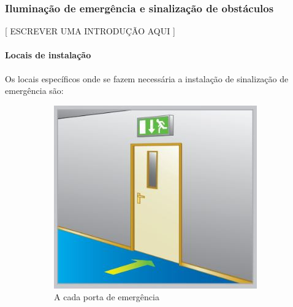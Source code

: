 \subsubsection{Iluminação de emergência e sinalização de obstáculos}

	[ ESCREVER UMA INTRODUÇÃO AQUI ]

	\paragraph{Locais de instalação}
	
	Os locais específicos onde se fazem necessária a instalação de sinalização de emergência são:
	
	\begin{figure}[H]
		\centering
		\begin{subfigure}[b]{0.30\textwidth}
			\centering
			\includegraphics[width=\textwidth]{Figures/3. Lighting/light-safety1.jpg}
			\caption{A cada porta de emergência}
			\label{fig: style 1 emergency a}
		\end{subfigure}
		\hfill
		\begin{subfigure}[b]{0.30\textwidth}
			\centering

\end{subfigure}
\end{figure}
